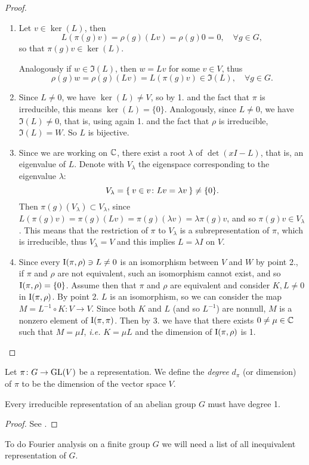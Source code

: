 \begin{proof}~ 
\begin{enumerate}
\item Let $v \in \ker(L)$, then 
\[
L(\pi(g)v)=\rho(g)(Lv)=\rho(g)0=0, \quad \forall g\in G,
\]
so that $\pi(g)v\in \ker(L)$.

Analogously if $w \in \Im(L)$, then $w=Lv$ for some $v\in V$, thus
\[
\rho(g)w=\rho(g)(Lv)=L(\pi(g)v)\in \Im(L), \quad \forall g\in G.
\]


\item Since $L\neq 0$, we have $\ker(L)\neq V$, so by 1. and the fact that $\pi$ is irreducible, this means $\ker(L)=\{0\}$. Analogously, since $L\neq 0$, we have $\Im(L)\neq 0$, that is, using again 1. and the fact that $\rho$ is irreducible, $\Im(L)=W$. So $L$ is bijective.
\item Since we are working on ${\mathbb C}$, there exist a root $\lambda$ of $\det(xI-L)$, that is, an eigenvalue of $L$. Denote with $V_\lambda$ the eigenspace corresponding to the eigenvalue $\lambda$:
\[
V_\lambda=\Set{v\in v \colon Lv=\lambda v}\neq \{0\}.
\] 
Then $\pi(g)(V_\lambda)\subset V_\lambda$, since $L(\pi(g)v)=\pi(g)(Lv)=\pi(g)(\lambda  v)=\lambda\pi(g) v$, and so $\pi(g)v\in V_\lambda$. This means that the restriction of $\pi$ to $V_\lambda$ is a subrepresentation of $\pi$, which is irreducible, thus $V_\lambda = V$ and this implies $L=\lambda I$ on $V$. 
\item Since every $\operatorname{I}(\pi,\rho)\ni L\neq 0$ is an isomorphism between $V$ and $W$ by point 2., if $\pi$ and $\rho$ are not equivalent, such an isomorphism cannot exist, and so $\operatorname{I}(\pi,\rho)=\{0\}$. Assume then that $\pi$ and $\rho$ are equivalent and consider $K,L\neq 0$ in  $\operatorname{I}(\pi,\rho)$. By point 2. $L$ is an isomorphism, so we can consider the map $M=L^{-1} \circ K\colon V\rightarrow V$. Since both $K$ and $L$ (and so $L^{-1}$) are nonnull, $M$ is a nonzero element of $\operatorname{I}(\pi,\pi)$. Then by 3. we have that there exists $0\neq \mu\in {\mathbb C}$ such that $M=\mu I$, \emph{i.e.} $K=\mu L$ and the dimension of $\operatorname{I}(\pi,\rho)$ is 1.
\end{enumerate}

\end{proof}
\begin{defn}
Let $\pi\colon G \rightarrow \operatorname{GL}(V)$ be a representation. We define the \emph{degree} $d_{\pi}$ (or dimension) of $\pi$ to be the dimension of the vector space $V$.
\end{defn}
\begin{cor}
Every irreducible representation of an abelian group $G$ must have degree 1.
\end{cor}
\begin{proof}
See \cite[p. 249]{terras_1999}.
\end{proof}
To do Fourier analysis on a finite group $G$ we will need a list of all inequivalent representation of $G$.

